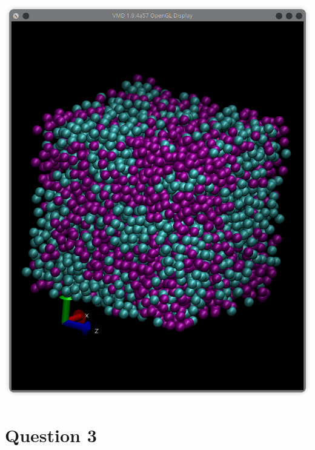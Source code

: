 \documentclass[11pt]{article}
\begin{document}
\includegraphics[scale=0.5]{Q2b_11eLF.png} \\

\section{Question 3}
\end{document}
